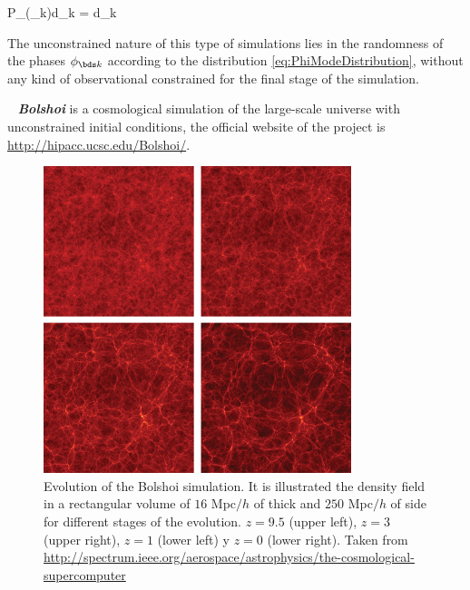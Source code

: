{ P_\phi(\phi_{\bds k})d\phi_{\bds k} = d\phi_{\bds k} }


The unconstrained nature of this type of simulations lies in the 
randomness of the phases $\phi_{\bds k}$ according to the distribution
\ref{eq:PhiModeDistribution}, without any kind of observational 
constrained for the final stage of the simulation.


\
\textbf{\textit{Bolshoi}} is a cosmological simulation of the large-scale
universe with unconstrained initial conditions, the official website of
the project is \url{http://hipacc.ucsc.edu/Bolshoi/}. 

\newpage
\begin{figure}
	\centering
	\includegraphics[width=0.80\textwidth]
	{./figures/3_nbody_simulations/Bolshoi_Evolution.png}

	\caption{\small{Evolution of the Bolshoi simulation. It is illustrated
	the density field in a rectangular volume of $16$ Mpc$/h$ of thick and
	$250$ Mpc$/h$ of side for different stages of the evolution. $z=9.5$ 
	(upper left), $z=3$ (upper right), $z=1$ (lower left) y $z=0$ (lower
	right). Taken from 
	\url{http://spectrum.ieee.org/aerospace/astrophysics/the-cosmological-supercomputer} }}
	
	\label{fig:Bolshoi_Evolution}
\end{figure}


